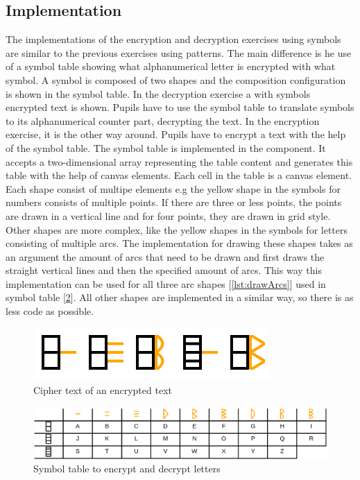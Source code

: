 \subsection{Implementation}

The implementations of the encryption and decryption exercises using symbols are similar to the previous exercises using patterns. The main difference is he use of a symbol table showing what alphanumerical letter is encrypted with what symbol. A symbol is composed of two shapes and the composition configuration is shown in the symbol table. In the decryption exercise a with symbols encrypted text is shown. Pupils have to use the symbol table to translate symbols to its alphanumerical counter part, decrypting the text. In the encryption exercise, it is the other way around. Pupils have to encrypt a text with the help of the symbol table.
The symbol table is implemented in the  component. It accepts a two-dimensional array representing the table content and generates this table with the help of canvas elements. Each cell in the table is a canvas element. Each shape consist of multipe elements e.g the yellow shape in the symbols for numbers consists of multiple points. If there are three or less points, the points are drawn in a vertical line and for four points, they are drawn in grid style. Other shapes are more complex, like the yellow shapes in the symbols for letters consisting of multiple arcs. The implementation for drawing these shapes takes as an argument the amount of arcs that need to be drawn and first draws the straight vertical lines and then the specified amount of arcs. This way this implementation can be used for all three arc shapes [\ref{lst:drawArcs}] used in symbol table [\ref{fig:symboltable_letters}]. 
All other shapes are implemented in a similar way, so there is as less code as possible.

\begin{figure} 
    \centering
    \includegraphics[width=0.4 \columnwidth]{figures/cipher_text.png}
    \caption{Cipher text of an encrypted text} 
    \label{fig:cipher_text} 
\end{figure}

\begin{figure} 
    \centering
    \includegraphics[width=1.0 \columnwidth]{figures/symboltable_letters.png}
    \caption{Symbol table to encrypt and decrypt letters} 
    \label{fig:symboltable_letters} 
\end{figure}

